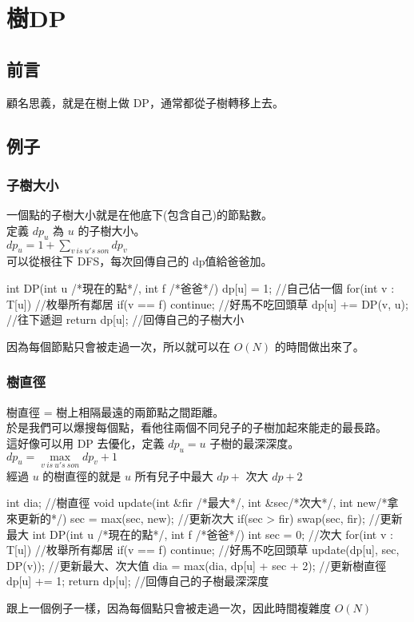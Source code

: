 \chapter{樹DP}
    \section{前言}
    顧名思義，就是在樹上做 DP，通常都從子樹轉移上去。
    \section{例子}
        \subsection{子樹大小}
        一個點的子樹大小就是在他底下(包含自己)的節點數。\\
        定義 $dp_u$ 為 $u$ 的子樹大小。\\
        $dp_u = 1 + \sum\limits_{v \ is \ u's \ son}{dp_v}$\\
        可以從根往下 DFS，每次回傳自己的 dp值給爸爸加。\\
        \begin{C++}
        int DP(int u /*現在的點*/, int f /*爸爸*/){
            dp[u] = 1; //自己佔一個
            for(int v : T[u]){ //枚舉所有鄰居
                if(v == f) continue; //好馬不吃回頭草
                dp[u] += DP(v, u); //往下遞迴
            }
            return dp[u]; //回傳自己的子樹大小
        }
        \end{C++}
        因為每個節點只會被走過一次，所以就可以在 $O(N)$ 的時間做出來了。
        
        \subsection{樹直徑}
        樹直徑 = 樹上相隔最遠的兩節點之間距離。\\
        於是我們可以爆搜每個點，看他往兩個不同兒子的子樹加起來能走的最長路。\\
        這好像可以用 DP 去優化，定義 $dp_u = u$ 子樹的最深深度。\\
        $dp_u = \max\limits_{v \ is \ u's \ son}{dp_v + 1}$\\
        經過 $u$ 的樹直徑的就是 $u$ 所有兒子中最大 $dp + $ 次大 $dp + 2$\\
        \begin{C++}
        int dia; //樹直徑
        void update(int &fir /*最大*/, int &sec/*次大*/, int new/*拿來更新的*/){
            sec = max(sec, new); //更新次大
            if(sec > fir) swap(sec, fir); //更新最大
        }
        int DP(int u /*現在的點*/, int f /*爸爸*/){
            int sec = 0; //次大
            for(int v : T[u]){ //枚舉所有鄰居
                if(v == f) continue; //好馬不吃回頭草
                update(dp[u], sec, DP(v)); //更新最大、次大值
            }
            dia = max(dia, dp[u] + sec + 2); //更新樹直徑
            dp[u] += 1;
            return dp[u]; //回傳自己的子樹最深深度
        }
        \end{C++}
        跟上一個例子一樣，因為每個點只會被走過一次，因此時間複雜度 $O(N)$
        
